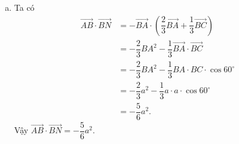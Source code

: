 \begin{bt}
{\begin{enumerate} [a)]
			\item Ta có $$\begin{aligned}
				\overrightarrow{A B} \cdot \overrightarrow{B N}&=-\overrightarrow{BA}\cdot \left(\dfrac{2}{3}\overrightarrow{BA}+\dfrac{1}{3}\overrightarrow{BC}\right)\\&=-\dfrac{2}{3}BA^2-\dfrac{1}{3}\overrightarrow{ BA} \cdot \overrightarrow{B C}\\&=-\dfrac{2}{3}BA^2-\dfrac{1}{3}BA \cdot BC \cdot \cos60^\circ\\&=-\dfrac{2}{3}a^2-\dfrac{1}{3}a\cdot a \cdot \cos60^\circ\\&=-\dfrac{5}{6}a^2.
			\end{aligned}$$
			Vậy $	\overrightarrow{A B} \cdot \overrightarrow{B N}= -\dfrac{5}{6}a^2$.
	\end{enumerate}}
\end{bt}
